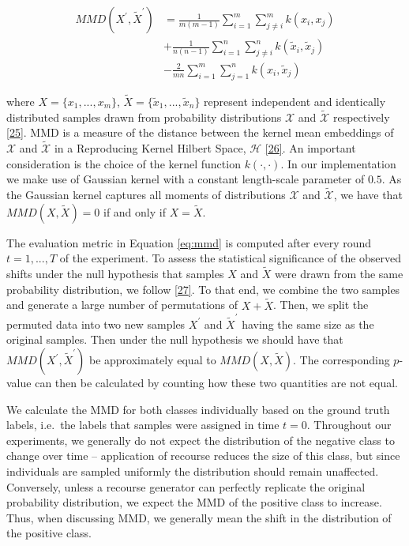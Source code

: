 \documentclass[conference,final,]{IEEEtran}
\theoremstyle{definition}
\theoremstyle{definition}
\theoremstyle{definition}
\theoremstyle{definition}
\theoremstyle{remark}
\begin{document}
\begin{equation}
\begin{aligned}
MMD({X}^\prime,\tilde{X}^\prime) &= \frac{1}{m(m-1)}\sum_{i=1}^m\sum_{j\neq i}^m k(x_i,x_j) \\ &+ \frac{1}{n(n-1)}\sum_{i=1}^n\sum_{j\neq i}^n k(\tilde{x}_i,\tilde{x}_j) \\ &- \frac{2}{mn}\sum_{i=1}^m\sum_{j=1}^n k(x_i,\tilde{x}_j) \label{eq:mmd}
\end{aligned}
\end{equation}

where \(X=\{x_1,...,x_m\}\), \(\tilde{X}=\{\tilde{x}_1,...,\tilde{x}_n\}\) represent independent and identically distributed samples drawn from probability distributions \(\mathcal{X}\) and \(\mathcal{\tilde{X}}\) respectively \protect\hyperlink{ref-gretton2012kernel}{{[}25{]}}. MMD is a measure of the distance between the kernel mean embeddings of \(\mathcal{X}\) and \(\mathcal{\tilde{X}}\) in a Reproducing Kernel Hilbert Space, \(\mathcal{H}\) \protect\hyperlink{ref-berlinet2011reproducing}{{[}26{]}}. An important consideration is the choice of the kernel function \(k(\cdot,\cdot)\). In our implementation we make use of Gaussian kernel with a constant length-scale parameter of \(0.5\). As the Gaussian kernel captures all moments of distributions \(\mathcal{X}\) and \(\mathcal{\tilde{X}}\), we have that \(MMD(X,\tilde{X})=0\) if and only if \(X=\tilde{X}\).

The evaluation metric in Equation \eqref{eq:mmd} is computed after every round \(t=1,...,T\) of the experiment. To assess the statistical significance of the observed shifts under the null hypothesis that samples \(X\) and \(\tilde{X}\) were drawn from the same probability distribution, we follow \protect\hyperlink{ref-arcones1992bootstrap}{{[}27{]}}. To that end, we combine the two samples and generate a large number of permutations of \(X + \tilde{X}\). Then, we split the permuted data into two new samples \(X^\prime\) and \(\tilde{X}^\prime\) having the same size as the original samples. Then under the null hypothesis we should have that \(MMD(X^\prime,\tilde{X}^\prime)\) be approximately equal to \(MMD(X,\tilde{X})\). The corresponding \(p\)-value can then be calculated by counting how these two quantities are not equal.

We calculate the MMD for both classes individually based on the ground truth labels, i.e.~the labels that samples were assigned in time \(t=0\). Throughout our experiments, we generally do not expect the distribution of the negative class to change over time -- application of recourse reduces the size of this class, but since individuals are sampled uniformly the distribution should remain unaffected. Conversely, unless a recourse generator can perfectly replicate the original probability distribution, we expect the MMD of the positive class to increase. Thus, when discussing MMD, we generally mean the shift in the distribution of the positive class.
\end{document}
